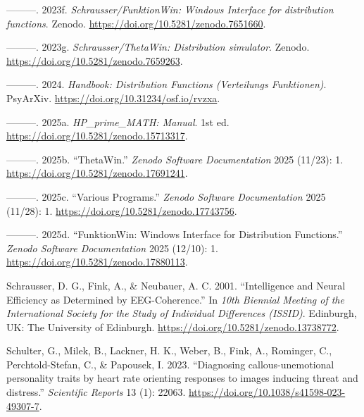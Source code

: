 \documentclass[
]{article}
\newlength{\cslhangindent}
\newlength{\cslentryspacingunit} %
\newenvironment{CSLReferences}[2] %
 {%
  \setlength{\parindent}{0pt}
  \ifodd #1
  \let\oldpar\par
  \def\par{\hangindent=\cslhangindent\oldpar}
  \fi
  \setlength{\parskip}{#2\cslentryspacingunit}
 }%
 {}
\begin{document}
\begin{CSLReferences}{1}{0}
\leavevmode{}%
---------. 2023f. \emph{{Schrausser/FunktionWin: Windows Interface for
distribution functions}}. Zenodo.
\url{https://doi.org/10.5281/zenodo.7651660}.

\leavevmode{}%
---------. 2023g. \emph{{Schrausser/ThetaWin: Distribution simulator}}.
Zenodo. \url{https://doi.org/10.5281/zenodo.7659263}.

\leavevmode{}%
---------. 2024. \emph{Handbook: Distribution Functions (Verteilungs
Funktionen)}. PsyArXiv. \url{https://doi.org/10.31234/osf.io/rvzxa}.

\leavevmode{}%
---------. 2025a. \emph{HP\_prime\_MATH: Manual}. 1st ed.
\url{https://doi.org/10.5281/zenodo.15713317}.

\leavevmode{}%
---------. 2025b. {``ThetaWin.''} \emph{Zenodo Software Documentation}
2025 (11/23): 1. \url{https://doi.org/10.5281/zenodo.17691241}.

\leavevmode{}%
---------. 2025c. {``Various Programs.''} \emph{Zenodo Software
Documentation} 2025 (11/28): 1.
\url{https://doi.org/10.5281/zenodo.17743756}.

\leavevmode{}%
---------. 2025d. {``FunktionWin: Windows Interface for Distribution
Functions.''} \emph{Zenodo Software Documentation} 2025 (12/10): 1.
\url{https://doi.org/10.5281/zenodo.17880113}.

\leavevmode{}%
Schrausser, D. G., Fink, A., \& Neubauer, A. C. 2001. {``Intelligence
and Neural Efficiency as Determined by EEG-Coherence.''} In \emph{10th
Biennial Meeting of the International Society for the Study of
Individual Differences (ISSID)}. Edinburgh, UK: The University of
Edinburgh. \url{https://doi.org/10.5281/zenodo.13738772}.

\leavevmode{}%
Schulter, G., Milek, B., Lackner, H. K., Weber, B., Fink, A., Rominger,
C., Perchtold-Stefan, C., \& Papousek, I. 2023. {``{Diagnosing
callous-unemotional personality traits by heart rate orienting responses
to images inducing threat and distress}.''} \emph{Scientific Reports} 13
(1): 22063. \url{https://doi.org/10.1038/s41598-023-49307-7}.


\end{CSLReferences}
\end{document}
